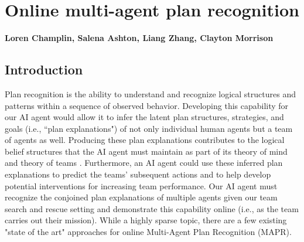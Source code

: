 \chapter{Online multi-agent plan recognition}
\label{ch:plan_recognition}
\textbf{Loren Champlin, Salena Ashton, Liang Zhang, Clayton Morrison}

\section{Introduction}

Plan recognition is the ability to understand and recognize logical structures and patterns within a sequence of observed behavior. Developing this capability for our AI agent would allow it to infer the latent plan structures, strategies, and goals (i.e., ``plan explanations") of not only individual human agents but a team of agents as well. Producing these plan explanations contributes to the logical belief structures that the AI agent must maintain as part of its theory of mind and theory of teams \citep{Tambe_1997,Baker_Tenenbaum_2014}. Furthermore, an AI agent could use these inferred plan explanations to predict the teams' subsequent actions and to help develop potential interventions for increasing team performance. Our AI agent must recognize the conjoined plan explanations of multiple agents given our team search and rescue setting and demonstrate this capability online (i.e., as the team carries out their mission). While a highly sparse topic, there are a few existing "state of the art" approaches for online Multi-Agent Plan Recognition (MAPR). 

